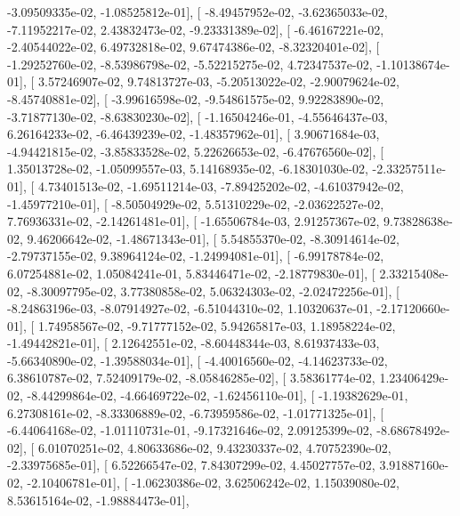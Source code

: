 \documentclass{article}
\begin{document}
         -3.09509335e-02,  -1.08525812e-01],
       [ -8.49457952e-02,  -3.62365033e-02,  -7.11952217e-02,
          2.43832473e-02,  -9.23331389e-02],
       [ -6.46167221e-02,  -2.40544022e-02,   6.49732818e-02,
          9.67474386e-02,  -8.32320401e-02],
       [ -1.29252760e-02,  -8.53986798e-02,  -5.52215275e-02,
          4.72347537e-02,  -1.10138674e-01],
       [  3.57246907e-02,   9.74813727e-03,  -5.20513022e-02,
         -2.90079624e-02,  -8.45740881e-02],
       [ -3.99616598e-02,  -9.54861575e-02,   9.92283890e-02,
         -3.71877130e-02,  -8.63830230e-02],
       [ -1.16504246e-01,  -4.55646437e-03,   6.26164233e-02,
         -6.46439239e-02,  -1.48357962e-01],
       [  3.90671684e-03,  -4.94421815e-02,  -3.85833528e-02,
          5.22626653e-02,  -6.47676560e-02],
       [  1.35013728e-02,  -1.05099557e-03,   5.14168935e-02,
         -6.18301030e-02,  -2.33257511e-01],
       [  4.73401513e-02,  -1.69511214e-03,  -7.89425202e-02,
         -4.61037942e-02,  -1.45977210e-01],
       [ -8.50504929e-02,   5.51310229e-02,  -2.03622527e-02,
          7.76936331e-02,  -2.14261481e-01],
       [ -1.65506784e-03,   2.91257367e-02,   9.73828638e-02,
          9.46206642e-02,  -1.48671343e-01],
       [  5.54855370e-02,  -8.30914614e-02,  -2.79737155e-02,
          9.38964124e-02,  -1.24994081e-01],
       [ -6.99178784e-02,   6.07254881e-02,   1.05084241e-01,
          5.83446471e-02,  -2.18779830e-01],
       [  2.33215408e-02,  -8.30097795e-02,   3.77380858e-02,
          5.06324303e-02,  -2.02472256e-01],
       [ -8.24863196e-03,  -8.07914927e-02,  -6.51044310e-02,
          1.10320637e-01,  -2.17120660e-01],
       [  1.74958567e-02,  -9.71777152e-02,   5.94265817e-03,
          1.18958224e-02,  -1.49442821e-01],
       [  2.12642551e-02,  -8.60448344e-03,   8.61937433e-03,
         -5.66340890e-02,  -1.39588034e-01],
       [ -4.40016560e-02,  -4.14623733e-02,   6.38610787e-02,
          7.52409179e-02,  -8.05846285e-02],
       [  3.58361774e-02,   1.23406429e-02,  -8.44299864e-02,
         -4.66469722e-02,  -1.62456110e-01],
       [ -1.19382629e-01,   6.27308161e-02,  -8.33306889e-02,
         -6.73959586e-02,  -1.01771325e-01],
       [ -6.44064168e-02,  -1.01110731e-01,  -9.17321646e-02,
          2.09125399e-02,  -8.68678492e-02],
       [  6.01070251e-02,   4.80633686e-02,   9.43230337e-02,
          4.70752390e-02,  -2.33975685e-01],
       [  6.52266547e-02,   7.84307299e-02,   4.45027757e-02,
          3.91887160e-02,  -2.10406781e-01],
       [ -1.06230386e-02,   3.62506242e-02,   1.15039080e-02,
          8.53615164e-02,  -1.98884473e-01],
\end{document}
